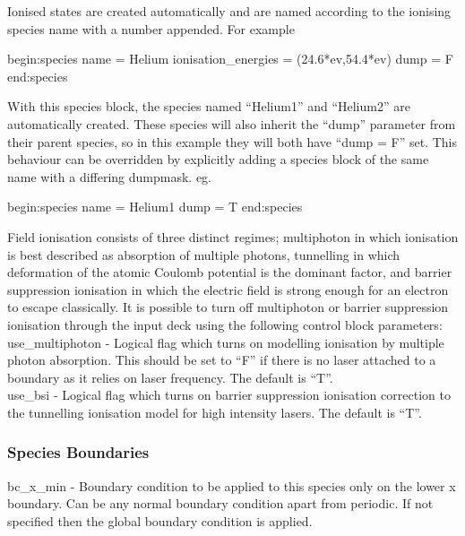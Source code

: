 Ionised states are created automatically and are named according to the
ionising species name with a number appended. For example
\begin{boxverbatim}
begin:species
   name = Helium
   ionisation_energies = (24.6*ev,54.4*ev)
   dump = F
end:species
\end{boxverbatim}
With this species block, the species named ``Helium1'' and ``Helium2''
are automatically created. These species will also inherit the ``dump''
parameter from their parent species, so in this example they will both have
``dump = F'' set. This behaviour can be overridden by explicitly
adding a species block of the same name with a differing dumpmask.
eg.
\begin{boxverbatim}
begin:species
   name = Helium1
   dump = T
end:species
\end{boxverbatim}


Field ionisation consists of three distinct regimes; multiphoton in which
ionisation is best described as absorption of multiple photons, tunnelling
in which deformation of the atomic Coulomb potential is the dominant factor,
and barrier suppression ionisation in which the electric field is strong
enough for an electron to escape classically. It is possible to turn off
multiphoton or barrier suppression ionisation through the input deck
using the following control block parameters:\\

{\emphtext use\_multiphoton} - Logical flag which turns on modelling
  ionisation by multiple photon absorption. This should be set to ``F'' if
  there is no laser attached to a boundary as it relies on laser frequency.
  The default is ``T''.\\

{\emphtext use\_bsi} - Logical flag which turns on barrier suppression
  ionisation correction to the tunnelling ionisation model for high intensity
  lasers. The default is ``T''.\\

\subsubsection{Species Boundaries}
\label{sec:per_species_bcs}

{\emphtext bc\_x\_min} - Boundary condition to be applied to this species only
on the lower x boundary. Can be any normal boundary condition apart
from periodic. If not specified then the global boundary condition is applied.\\

